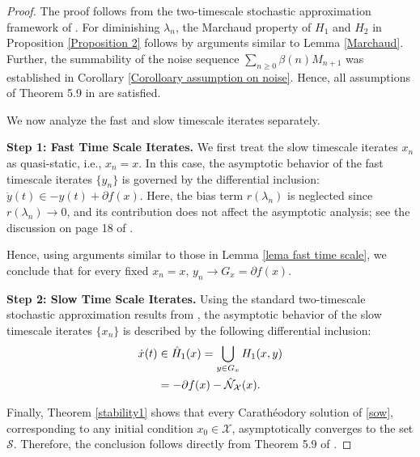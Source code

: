 \documentclass[9pt,journal,twoside,web]{ieeecolor}
\begin{document}
\begin{proof}
The proof follows from the two-timescale stochastic approximation framework of \cite{yaji2020stochastic}. For diminishing $\lambda_n$, the Marchaud property of $H_1$ and $H_2$ in Proposition \ref{Proposition 2} follows by arguments similar to Lemma \ref{Marchaud}. Further, the summability of the noise sequence $\sum_{n\geq 0} \beta(n) M_{n+1}$ was established in Corollary \ref{Corolloary assumption on noise}. Hence, all assumptions of Theorem 5.9 in \cite{yaji2020stochastic} are satisfied.

We now analyze the fast and slow timescale iterates separately.

\textbf{Step 1: Fast Time Scale Iterates.}
We first treat the slow timescale iterates $x_n$ as quasi-static, i.e., $x_n=x$. In this case, the asymptotic behavior of the fast timescale iterates $\{y_n\}$ is governed by the differential inclusion: $\Dot{y}(t) \in -y(t) + \partial f(x).$
Here, the bias term $r(\lambda_n)$ is neglected since $r(\lambda_n)\to 0$, and its contribution does not affect the asymptotic analysis; see the discussion on page 18 of \cite{borkar2008stochastic}.

Hence, using arguments similar to those in Lemma \ref{lema fast time scale}, we conclude that for every fixed $x_n=x$, $ y_n \to G_x = \partial f(x).$

\textbf{Step 2: Slow Time Scale Iterates.}
Using the standard two-timescale stochastic approximation results from \cite{yaji2020stochastic}, the asymptotic behavior of the slow timescale iterates $\{x_n\}$ is described by the following differential inclusion:
\begin{equation}
    \begin{split}
        \Dot{x}(t)
        &\in \Hat{H}_1(x)
        =
        \bigcup_{y\in G_x} H_1(x,y)
        \\
        &=
        -\partial f(x)-\Hat{\mathcal{N}}_{\mathcal{X}}(x).
    \end{split}
    \label{sow}
\end{equation}

Finally, Theorem \ref{stability1} shows that every Carath\'eodory solution of \eqref{sow}, corresponding to any initial condition $x_0\in\mathcal{X}$, asymptotically converges to the set $\mathcal{S}$. Therefore, the conclusion follows directly from Theorem 5.9 of \cite{yaji2020stochastic}.
\end{proof}
\end{document}
